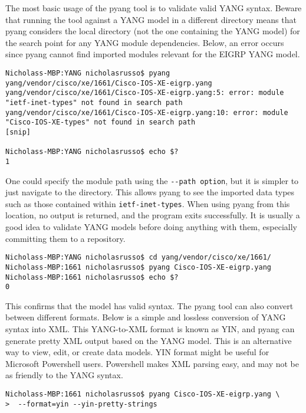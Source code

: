 The most basic usage of the pyang tool is to validate valid YANG syntax.
Beware that running the tool against a YANG model in a different directory
means that pyang considers the local directory (not the one containing the
YANG model) for the search point for any YANG module dependencies. Below, an
error occurs since pyang cannot find imported modules relevant for the EIGRP
YANG model.

\begin{verbatim}
Nicholass-MBP:YANG nicholasrusso$ pyang yang/vendor/cisco/xe/1661/Cisco-IOS-XE-eigrp.yang 
yang/vendor/cisco/xe/1661/Cisco-IOS-XE-eigrp.yang:5: error: module
"ietf-inet-types" not found in search path
yang/vendor/cisco/xe/1661/Cisco-IOS-XE-eigrp.yang:10: error: module
"Cisco-IOS-XE-types" not found in search path
[snip]

Nicholass-MBP:YANG nicholasrusso$ echo $?
1
\end{verbatim}

One could specify the module path using the \verb|--path option|, but it is
simpler to just navigate to the directory. This allows pyang to see the
imported data types such as those contained within \verb|ietf-inet-types|. When
using pyang from this location, no output is returned, and the program exits
successfully. It is usually a good idea to validate YANG models before doing
anything with them, especially committing them to a repository.

\begin{verbatim}
Nicholass-MBP:YANG nicholasrusso$ cd yang/vendor/cisco/xe/1661/
Nicholass-MBP:1661 nicholasrusso$ pyang Cisco-IOS-XE-eigrp.yang
Nicholass-MBP:1661 nicholasrusso$ echo $?
0
\end{verbatim}

This confirms that the model has valid syntax. The pyang tool can also convert
between different formats. Below is a simple and lossless conversion of YANG
syntax into XML\@. This YANG-to-XML format is known as YIN, and pyang can
generate pretty XML output based on the YANG model. This is an alternative way
to view, edit, or create data models. YIN format might be useful for Microsoft
Powershell users. Powershell makes XML parsing easy, and may not be as
friendly to the YANG syntax.

\begin{verbatim}
Nicholass-MBP:1661 nicholasrusso$ pyang Cisco-IOS-XE-eigrp.yang \
>  --format=yin --yin-pretty-strings
\end{verbatim}

